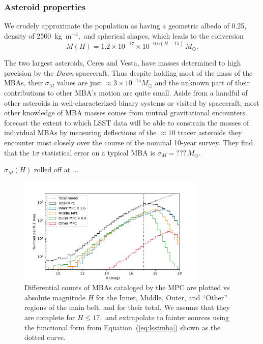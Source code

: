 \documentclass[linenumbers, onecolumn]{aastex631}
\newcommand{\eqq}[1]{Equation~(\ref{#1})}
\begin{document}
\subsubsection{Asteroid properties}
We crudely approximate the population as having a geometric albedo of 0.25,
density of 2500~kg~m$^{-3},$ and spherical shapes, which leads to the
conversion
\begin{equation}
  M(H) = 1.2\times10^{-17} \times 10^{-0.6(H-15)}\, M_\odot.
\end{equation}

The two largest asteroids, Ceres and Vesta, have masses determined to
high precision by the \textit{Dawn} spacecraft.  Thus despite holding
most of the mass of the MBAs, their $\sigma_M$ values are just
$\approx3\times10^{-15} M_\odot$ and
the unknown part of their contributions to other MBA's motion are
quite small.  Aside from a handful of other asteroids in
well-characterized binary systems or visited by spacecraft, most other knowledge of MBA masses
comes from mutual gravitational encounters.
\citet{negin} forecast the extent to which LSST data will be able to
constrain the masses of individual MBAs by measuring deflections of
the $\approx 10$ tracer asteroids they encounter most closely over the
course of the nominal 10-year survey.  They find that the $1\sigma$
statistical error on a typical MBA is $\sigma_M=???\, M_\odot.$

$\sigma_M(H)$ rolled off at ...

\begin{figure}
  \centering
  \includegraphics[width=0.8\textwidth]{mbacounts.pdf}
  \caption{Differential counts of MBAs cataloged by the MPC are
    plotted vs absolute magnitude $H$  
    for the Inner, Middle, Outer, and ``Other'' regions of
    the main belt, and for their total.  We assume that they are
    complete for $H\le17,$ and extrapolate to fainter sources using
    the functional form from \eqq{eq:lsstmba} shown as the dotted
    curve.}
  \label{fig:counts}
\end{figure}
\end{document}
